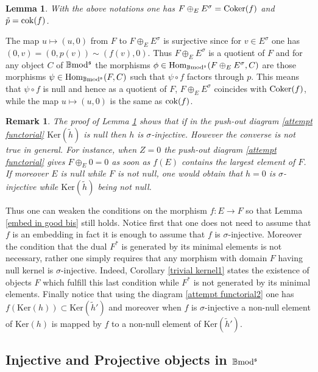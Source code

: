 \documentclass[12pt]{article}
\newtheorem{lem}[thm]{Lemma}
\newtheorem{rem}[thm]{Remark}
\def\Hom{{\rm Hom}}
\def\coker{{\rm Coker}}
\def\scoker{{\rm cok}}
\def\B{{\mathbb B}}
\def\ker{{\mbox{Ker}}}
\def\Hom {{\mbox{Hom}}}
\def\b2{{\rm \B mod^{\mathfrak s}}}
\begin{document}
\begin{lem}\label{coker pushout}
	With the above notations one has  $F\oplus_{E} E^\sigma=\coker(f)$ and $\tilde p=\scoker(f)$.
\end{lem}
\proof The map $u\mapsto (u,0)$ from $F$ to $F\oplus_{E} E^\sigma$ is surjective since for $v\in E^\sigma$ one has $(0,v)=(0,p(v))\sim (f(v),0)$. Thus $F\oplus_{E} E^\sigma$ is a quotient of $F$ and for any object $C$ of $\b2$ the morphisms $\phi\in \Hom_\b2(F\oplus_{E} E^\sigma,C)$ are those morphisms 
$\psi\in \Hom_\b2(F,C)$ such that $\psi\circ f$ factors through $p$. This means that $\psi\circ f$ is null and hence as a quotient of $F$, $F\oplus_{E} E^\sigma$ coincides with $\coker(f)$, while the map $u\mapsto (u,0)$ is the same as $\scoker(f)$.\endproof 

\begin{rem}\label{pushout converse} The proof of Lemma \ref{coker pushout} shows that if in the  push-out diagram \eqref{attempt functorial} $\ker(\tilde h)$ is null then $h$  is $\sigma$-injective. However the converse is not true in general. For instance, when $Z=0$ the  push-out diagram \eqref{attempt functorial}  gives $F\oplus_{E}0=0$ as soon as $f(E)$ contains the largest element of $F$. If moreover $E$ is null while $F$ is not null, one would obtain that $h=0$ is $\sigma$-injective while $\ker(\tilde h)$ being not null.	
\end{rem}
Thus one can weaken the conditions on the morphism $f:E\to F$ so that Lemma \ref{embed in good bis} still holds. Notice first that one does not need to assume that $f$ is an embedding in fact it is enough to assume that $f$ is $\sigma$-injective. Moreover the condition that the dual $F^*$ is generated by its minimal elements is not necessary, rather one simply requires that any morphism with domain $F$ having null kernel is $\sigma$-injective. Indeed, Corollary \ref{trivial kernel1} states the existence  of objects $F$ which fulfill this last condition while $F^*$ is not generated by its minimal elements. Finally notice that using the diagram \eqref{attempt functorial2} one has $f(\ker(h))\subset \ker(\tilde h')$ and moreover when $f$ is $\sigma$-injective a non-null element of $\ker(h)$ is mapped by $f$ to a non-null element of $\ker(\tilde h')$.

\subsection{Injective and Projective objects in  $\b2$}\label{sectinjproj}
\end{document}
